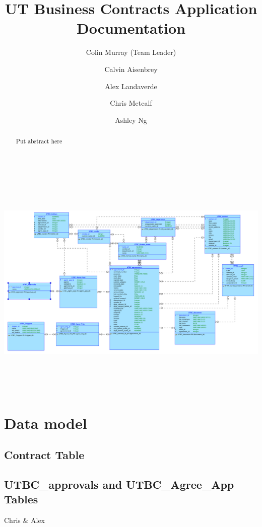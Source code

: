 \documentclass{report}
\begin{document}
\title{\bfseries UT Business Contracts Application Documentation}

\author{
	Colin Murray (Team Leader)
	\and
	Calvin Aisenbrey
	\and
	Alex Landaverde
	\and
	Chris Metcalf
	\and
	Ashley Ng
}

\maketitle

\begin{abstract}
Put abstract here
\end{abstract}

\tableofcontents

\newpage

\begin{image}
\centering
\includegraphics[height = 4.5in, angle = 90]{UTBC_model}
\end{image}



\chapter{Data model}

\section{Contract Table}

\section{UTBC\_approvals and UTBC\_Agree\_App Tables}
Chris & Alex
\end{document}
